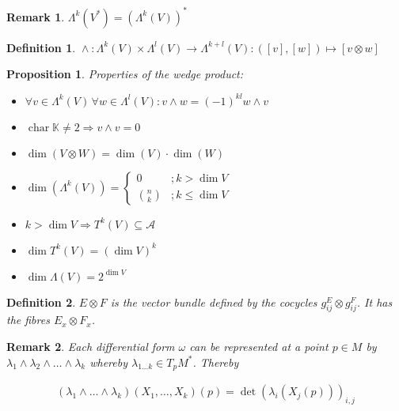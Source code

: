\documentclass{scrartcl}
\newtheorem*{mydef}{Definition}
\newtheorem*{prop}{Proposition}
\newtheorem*{remark}{Remark}
\begin{document}
\begin{remark}
  $\Lambda^k(V^*) = \left(\Lambda^k(V)\right)^*$
\end{remark}

\begin{mydef}
  ${}\wedge{} : \Lambda^k(V) \times \Lambda^l(V) \rightarrow \Lambda^{k+l}(V): ([v],[w]) \mapsto [v\otimes w]$
\end{mydef}

\begin{prop}
  Properties of the wedge product:

  \begin{itemize}
  \item $\forall v\in \Lambda^k(V)\,\forall w\in \Lambda^l(V): v \wedge w = (-1)^{kl} w \wedge v$
  \item $\operatorname{char} \mathbb K \ne 2 \Rightarrow v \wedge v = 0$
  \item $\operatorname{dim}(V\otimes W)=\operatorname{dim}(V) \cdot \operatorname{dim}(W)$
  \item $\operatorname{dim}\left(\Lambda^k(V)\right) = \left\{ \begin{matrix} 0 & ; k > \operatorname{dim} V \\ \binom nk & ; k \le \operatorname{dim} V \end{matrix} \right.$
  \item $k > \operatorname{dim} V \Rightarrow T^k(V) \subseteq \mathcal A$
  \item $\operatorname{dim} T^k(V) = (\operatorname{dim} V)^k$
  \item $\operatorname{dim} \Lambda(V) = 2^{\operatorname{dim} V}$
  \end{itemize}
\end{prop}

\begin{mydef}
  $E\otimes F$ is the vector bundle defined by the cocycles $g_{ij}^E \otimes g_{ij}^F$. It has the fibres $E_x \otimes F_x$.
\end{mydef}

\begin{remark}
  Each differential form $\omega$ can be represented at a point $p\in M$ by $\lambda_1 \wedge \lambda_2 \wedge \dots \wedge \lambda_k$ whereby $\lambda_{1\dots k}\in T_p M^*$. Thereby

  \begin{align}
    (\lambda_1 \wedge \dots \wedge \lambda_k)(X_1,\ldots,X_k)(p) = \operatorname{det}\left(\lambda_i\left(X_j(p)\right)\right)_{i,j}
  \end{align}
\end{remark}
\end{document}
